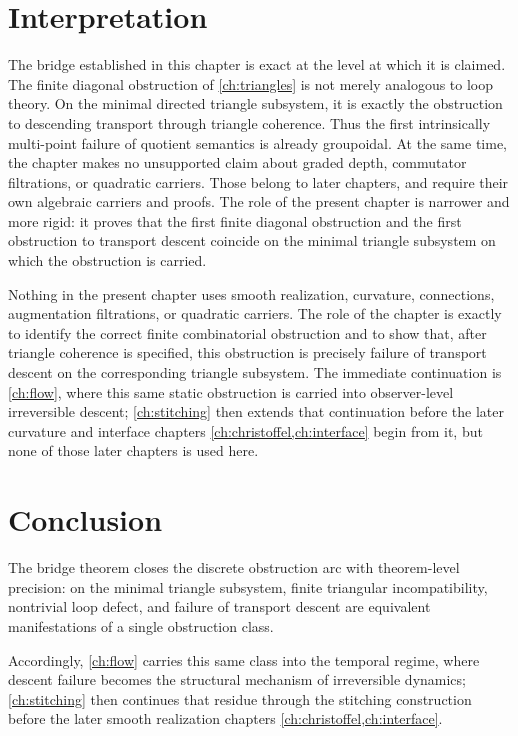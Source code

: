 \section{Interpretation}
The bridge established in this chapter is exact at the level at which
it is claimed.
The finite diagonal obstruction of \cref{ch:triangles} is not merely
analogous to loop theory. On the minimal directed triangle subsystem,
it is exactly the obstruction to descending transport through triangle
coherence. Thus the first intrinsically multi-point failure of
quotient semantics is already groupoidal.
At the same time, the chapter makes no unsupported claim about graded
depth, commutator filtrations, or quadratic carriers. Those belong to
later chapters, and require their own algebraic carriers and proofs.
The role of the present chapter is narrower and more rigid: it proves
that the first finite diagonal obstruction and the first obstruction to
transport descent coincide on the minimal triangle subsystem on which
the obstruction is carried.
\begin{remark}
	Nothing in the present chapter uses smooth realization, curvature,
	connections, augmentation filtrations, or quadratic carriers. The role
	of the chapter is exactly to identify the correct finite combinatorial
	obstruction and to show that, after triangle coherence is specified,
	this obstruction is precisely failure of transport descent on the
	corresponding triangle subsystem. The immediate continuation is
	\cref{ch:flow}, where this same static obstruction is carried into
	observer-level irreversible descent; \cref{ch:stitching} then extends
	that continuation before the later curvature and interface chapters
	\cref{ch:christoffel,ch:interface} begin from it, but none of those
	later chapters is used here.
\end{remark}

\section{Conclusion}
\label{sec:bridge-conclusion}
The bridge theorem closes the discrete obstruction arc with theorem-level
precision: on the minimal triangle subsystem, finite triangular
incompatibility, nontrivial loop defect, and failure of transport descent
are equivalent manifestations of a single obstruction class.

Accordingly, \cref{ch:flow} carries this same class into the temporal
regime, where descent failure becomes the structural mechanism of
irreversible dynamics; \cref{ch:stitching} then continues that residue
through the stitching construction before the later smooth realization
chapters \cref{ch:christoffel,ch:interface}.

\begin{chapterclosing}
\end{chapterclosing}
